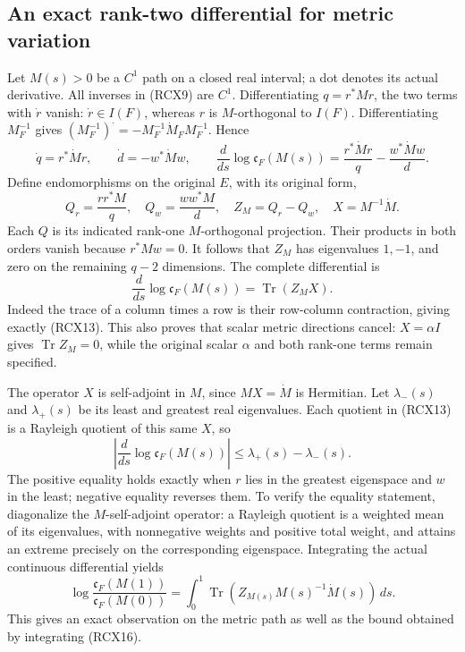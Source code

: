 \subsection{An exact rank-two differential for metric variation}

Let \(M(s)>0\) be a \(C^1\) path on a closed real interval; a dot denotes
its actual derivative. All inverses in (RCX9) are \(C^1\).
Differentiating \(q=r^*Mr\), the two terms with \(\dot r\) vanish:
\(\dot r\in I(F)\), whereas \(r\) is \(M\)-orthogonal to \(I(F)\).
Differentiating \(M_F^{-1}\) gives
\((M_F^{-1})^{\displaystyle\cdot}=-M_F^{-1}\dot M_F M_F^{-1}\).
Hence
\[
 \dot q=r^*\dot M r,\qquad
 \dot d=-w^*\dot M w,\qquad
 \boxed{\frac{d}{ds}\log\mathfrak c_F(M(s))
       =\frac{r^*\dot M r}{q}-\frac{w^*\dot M w}{d}.}
 \tag{RCX13}
\]
Define endomorphisms on the original \(E\), with its original form,
\[
 Q_r=\frac{rr^*M}{q},\quad Q_w=\frac{ww^*M}{d},\quad
 Z_M=Q_r-Q_w,\quad X=M^{-1}\dot M.
 \tag{RCX14}
\]
Each \(Q\) is its indicated rank-one \(M\)-orthogonal projection.
Their products in both orders vanish because \(r^*Mw=0\).
It follows that \(Z_M\) has eigenvalues \(1,-1\), and zero on the
remaining \(q-2\) dimensions. The complete differential is
\[
 \boxed{\frac{d}{ds}\log\mathfrak c_F(M(s))
            =\operatorname{Tr}(Z_M X).}
 \tag{RCX15}
\]
Indeed the trace of a column times a row is their row-column
contraction, giving exactly (RCX13). This also proves that scalar
metric directions cancel: \(X=\alpha I\) gives
\(\operatorname{Tr}Z_M=0\), while the original scalar \(\alpha\)
and both rank-one terms remain specified.

The operator \(X\) is self-adjoint in \(M\), since \(MX=\dot M\)
is Hermitian. Let \(\lambda_-(s)\) and \(\lambda_+(s)\) be its least
and greatest real eigenvalues. Each quotient in (RCX13) is a Rayleigh
quotient of this same \(X\), so
\[
 \left|\frac{d}{ds}\log\mathfrak c_F(M(s))\right|
       \le\lambda_+(s)-\lambda_-(s).
 \tag{RCX16}
\]
The positive equality holds exactly when \(r\) lies in the greatest
eigenspace and \(w\) in the least; negative equality reverses them.
To verify the equality statement, diagonalize the \(M\)-self-adjoint
operator: a Rayleigh quotient is a weighted mean of its eigenvalues,
with nonnegative weights and positive total weight, and attains an
extreme precisely on the corresponding eigenspace.
Integrating the actual continuous differential yields
\[
 \log\frac{\mathfrak c_F(M(1))}{\mathfrak c_F(M(0))}
   =\int_0^1\operatorname{Tr}(Z_{M(s)}M(s)^{-1}\dot M(s))\,ds .
 \tag{RCX17}
\]
This gives an exact observation on the metric path as well as the
bound obtained by integrating (RCX16).

